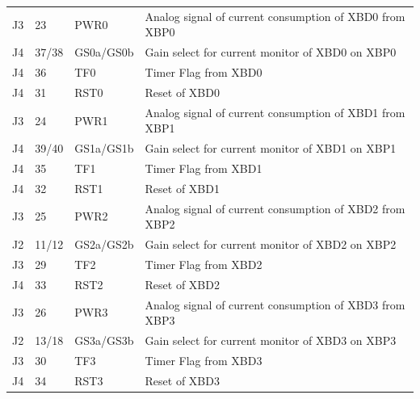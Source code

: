 \documentclass[twoside,11pt]{cergdoc}
\begin{document}
\begin{appendix}
\begin{table}[ht]
\begin{center}
\begin{tabular}{rlll}
       J3 & 23 & PWR0      & Analog signal of current consumption of XBD0 from XBP0\\
       J4 & 37/38 & GS0a/GS0b & Gain select for current monitor of XBD0 on XBP0\\
       J4 & 36 & TF0       & Timer Flag from XBD0 \\
       J4 & 31 & RST0      & Reset of XBD0 \\ \hline

       J3 & 24 & PWR1      & Analog signal of current consumption of XBD1 from XBP1 \\
       J4 & 39/40 & GS1a/GS1b & Gain select for current monitor of XBD1 on XBP1\\
       J4 & 35 & TF1       & Timer Flag from XBD1 \\
       J4 & 32 & RST1      & Reset of XBD1 \\ \hline

       J3 & 25 & PWR2      & Analog signal of current consumption of XBD2 from XBP2 \\
       J2 & 11/12 & GS2a/GS2b & Gain select for current monitor of XBD2 on XBP2\\
       J3 & 29 & TF2       & Timer Flag from XBD2 \\
       J4 & 33 & RST2      & Reset of XBD2 \\ \hline

       J3 & 26 & PWR3      & Analog signal of current consumption of XBD3 from XBP3 \\
       J2 & 13/18 & GS3a/GS3b & Gain select for current monitor of XBD3 on XBP3\\
       J3 & 30 & TF3       & Timer Flag from XBD3 \\
       J4 & 34 & RST3      & Reset of XBD3 \\ \hline


\end{tabular}
\end{center}
\end{table}
\end{appendix}
\end{document}
